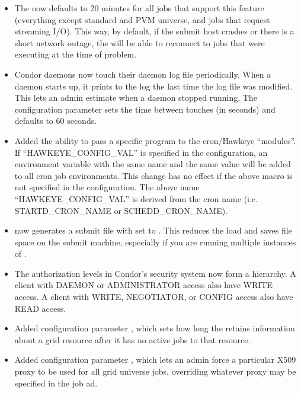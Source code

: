 \begin{itemize}
\item The  now defaults to 20 minutes for all
jobs that support this feature (everything except standard and PVM
universe, and jobs that request streaming I/O).
This way, by default, if the submit host crashes or there is a short
network outage, the  will be able to reconnect to jobs
that were executing at the time of problem.

\item Condor daemons now touch their daemon log file periodically. When
a daemon starts up, it prints to the log the last time the log file was
modified. This lets an admin estimate when a daemon stopped running.
The configuration parameter  sets the time
between touches (in seconds) and defaults to 60 seconds.


\item Added the ability to pass a specific  program
to the cron/Hawkeye ``modules''.  If ``HAWKEYE\_CONFIG\_VAL'' is
specified in the configuration, an environment variable with the same
name and the same value will be added to all cron job environments.
This change has no effect if the above macro is not specified in the
configuration.  The above name ``HAWKEYE\_CONFIG\_VAL'' is
derived from the cron name (i.e. STARTD\_CRON\_NAME or
SCHEDD\_CRON\_NAME).

\item {} now generates a submit file with
 set to .  This reduces the load and
saves file space on the submit machine, especially if you are running
multiple instances of .

\item The authorization levels in Condor's security system now form a
hierarchy. A client with DAEMON or ADMINISTRATOR access also have WRITE
access. A client with WRITE, NEGOTIATOR, or CONFIG access also have
READ access.

\item Added configuration parameter
, which sets how long the
 retains information about a grid resource after it
has no active jobs to that resource.

\item Added configuration parameter ,
which lets an admin force a particular X509 proxy to be used for all
grid universe jobs, overriding whatever proxy may be specified in the
job ad.


\end{itemize}

